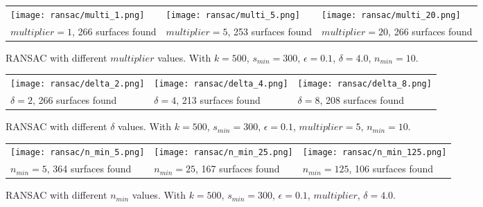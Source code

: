 \documentclass[a4paper,9pt]{article}
\begin{document}
\begin{figure}[H]
    \begin{tabularx}{\textwidth}{XXX}
        \texttt{[image: ransac/multi\_1.png]} & 
        \texttt{[image: ransac/multi\_5.png]} & 
        \texttt{[image: ransac/multi\_20.png]} \\
        $multiplier = 1$, 266 surfaces found & $multiplier = 5$, 253 surfaces found & $multiplier = 20$, 266 surfaces found
    \end{tabularx}
    \caption{RANSAC with different $multiplier$ values. With $k=500$, $s_{min}=300$, $\epsilon=0.1$, $\delta=4.0$, $n_{min}=10$.}
    \label{fig:variant_multi}
\end{figure}

\begin{figure}[H]
    \begin{tabularx}{\textwidth}{XXX}
        \texttt{[image: ransac/delta\_2.png]} & 
        \texttt{[image: ransac/delta\_4.png]} & 
        \texttt{[image: ransac/delta\_8.png]} \\
        $\delta = 2$, 266 surfaces found & $\delta = 4$, 213 surfaces found & $\delta = 8$, 208 surfaces found
    \end{tabularx}
    \caption{RANSAC with different $\delta$ values. With $k=500$, $s_{min}=300$, $\epsilon=0.1$, $multiplier=5$, $n_{min}=10$.}
    \label{fig:variant_delta}
\end{figure}

\begin{figure}[H]
    \begin{tabularx}{\textwidth}{XXX}
        \texttt{[image: ransac/n\_min\_5.png]} & 
        \texttt{[image: ransac/n\_min\_25.png]} & 
        \texttt{[image: ransac/n\_min\_125.png]} \\
        $n_{min} = 5$, 364 surfaces found & $n_{min} = 25$, 167 surfaces found & $n_{min} = 125$, 106 surfaces found
    \end{tabularx}
    \caption{RANSAC with different $n_{min}$ values. With $k=500$, $s_{min}=300$, $\epsilon=0.1$, $multiplier$, $\delta=4.0$.}
    \label{fig:variant_n_min}
\end{figure}
\end{document}

